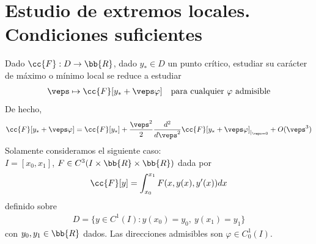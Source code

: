 \chapter{Estudio de extremos locales. Condiciones suficientes}

Dado $\cc{F}:D \to \bb{R}$, dado $y_*\in D$ un punto crítico, estudiar su carácter de máximo o mínimo local se reduce a estudiar
\begin{gather*}
    \veps \mapsto \cc{F}[y_* + \veps \varphi] \ \ \text{ para cualquier $\varphi$ admisible}
\end{gather*}
De hecho, 
\begin{gather*}
    \cc{F}[y_*+\veps\varphi] = \cc{F}[y_*] + \frac{\veps^2}{2} \frac{d^2}{d\veps^2} \cc{F}[y_* + \veps\varphi]_{|_{\veps = 0}} + O(\veps^3)
\end{gather*}
Solamente consideramos el siguiente caso:\\

$I=[x_0, x_1]$, $F\in C^3(I \times \bb{R} \times \bb{R})$ dada por 
\begin{gather*}
    \cc{F}[y] = \int_{x_0}^{x_1} F(x, y(x), y'(x)) dx
\end{gather*}
definido sobre
\begin{gather*}
    D = \{y\in C^1(I) : y(x_0)=y_0,\ y(x_1)=y_1\}
\end{gather*}
con $y_0,y_1\in \bb{R}$ dados. Las direcciones admisibles son $\varphi\in C_0^1(I)$.\\

